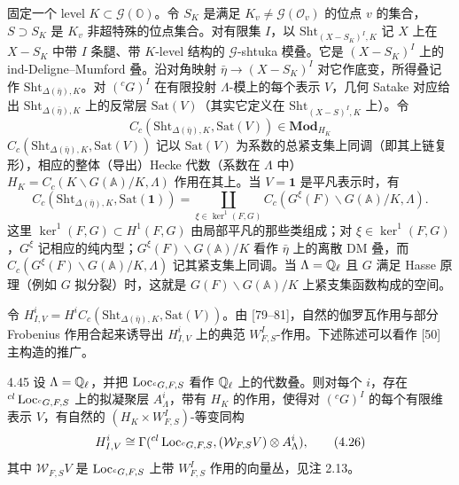 固定一个 level $K\subset\mathcal G(\mathbb O)$。令 $S_K$ 是满足 $K_v\ne\mathcal G(\mathcal O_v)$ 的位点 $v$ 的集合，$S\supset S_K$ 是 $K_v$ 非超特殊的位点集合。对有限集 $I$，以 $\mathrm{Sht}_{(X-S_K)^I,K}$ 记 $X$ 上在 $X-S_K$ 中带 $I$ 条腿、带 $K$-level 结构的 $\mathcal G$-shtuka 模叠。它是 $(X-S_K)^I$ 上的 ind-Deligne–Mumford 叠。沿对角映射 $\bar\eta\to(X-S_K)^I$ 对它作底变，所得叠记作 $\mathrm{Sht}_{\Delta(\bar\eta),K}$。对 $({}^{c}G)^I$ 在有限投射 $\Lambda$-模上的每个表示 $V$，几何 Satake 对应给出 $\mathrm{Sht}_{\Delta(\bar\eta),K}$ 上的反常层 $\mathrm{Sat}(V)$（其实它定义在 $\mathrm{Sht}_{(X-S)^I,K}$ 上）。令
\[
C_c(\mathrm{Sht}_{\Delta(\bar\eta),K},\mathrm{Sat}(V))\in\mathbf{Mod}_{H_K}
\]
$C_c(\mathrm{Sht}_{\Delta(\bar\eta),K},\mathrm{Sat}(V))$ 记以 $\mathrm{Sat}(V)$ 为系数的总紧支集上同调（即其上链复形），相应的整体（导出）Hecke 代数（系数在 $\Lambda$ 中）$H_K=C_c(K\backslash G(\mathbb A)/K,\Lambda)$ 作用在其上。当 $V=\mathbf 1$ 是平凡表示时，有
\[
C_c(\mathrm{Sht}_{\Delta(\bar\eta),K},\mathrm{Sat}(\mathbf 1))=\coprod_{\xi\in\ker^1(F,G)}C_c(G^\xi(F)\backslash G(\mathbb A)/K,\Lambda).
\]
这里 $\ker^1(F,G)\subset H^1(F,G)$ 由局部平凡的那些类组成；对 $\xi\in\ker^1(F,G)$，$G^\xi$ 记相应的纯内型；$G^\xi(F)\backslash G(\mathbb A)/K$ 看作 $\bar\eta$ 上的离散 DM 叠，而 $C_c(G^\xi(F)\backslash G(\mathbb A)/K,\Lambda)$ 记其紧支集上同调。当 $\Lambda=\mathbb{Q}_\ell$ 且 $G$ 满足 Hasse 原理（例如 $G$ 拟分裂）时，这就是 $G(F)\backslash G(\mathbb A)/K$ 上紧支集函数构成的空间。

令 $H^i_{I,V}=H^iC_c(\mathrm{Sht}_{\Delta(\bar\eta),K},\mathrm{Sat}(V))$。由 [79–81]，自然的伽罗瓦作用与部分 Frobenius 作用合起来诱导出 $H^i_{I,V}$ 上的典范 $W^I_{F,S}$-作用。下述陈述可以看作 [50] 主构造的推广。

\begin{thm}{4.45}\label{thm:a2-4-45}
设 $\Lambda=\mathbb{Q}_\ell$，并把 $\operatorname{Loc}_{{}^{c}G,F,S}$ 看作 $\mathbb{Q}_\ell$ 上的代数叠。则对每个 $i$，存在 ${}^{cl}\operatorname{Loc}_{{}^{c}G,F,S}$ 上的拟凝聚层 $A^i_\Lambda$，带有 $H_K$ 的作用，使得对 $({}^{c}G)^I$ 的每个有限维表示 $V$，有自然的 $(H_K\times W^I_{F,S})$-等变同构
\begin{equation}
H^i_{I,V}\cong\Gamma({}^{cl}\operatorname{Loc}_{{}^{c}G,F,S},(\mathcal W_{F,S}V)\otimes A^i_\Lambda), \tag{4.26}\label{eq:a2-4-26}
\end{equation}
其中 $\mathcal W_{F,S}V$ 是 $\operatorname{Loc}_{{}^{c}G,F,S}$ 上带 $W^I_{F,S}$ 作用的向量丛，见注 2.13。
\end{thm}

